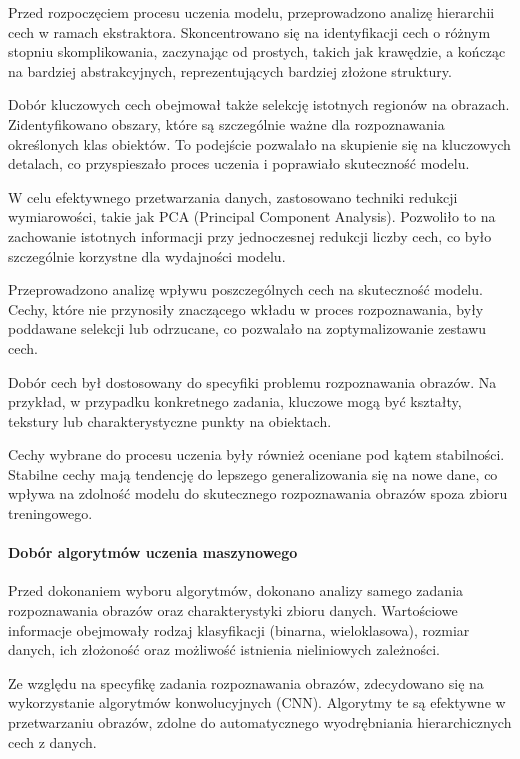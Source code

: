 \documentclass[12pt, a4paper, twoside, openany]{book}
\begin{document}
Przed rozpoczęciem procesu uczenia modelu, przeprowadzono analizę hierarchii cech w ramach ekstraktora.
Skoncentrowano się na identyfikacji cech o różnym stopniu skomplikowania, zaczynając od prostych, takich jak krawędzie, a kończąc na bardziej abstrakcyjnych, reprezentujących bardziej złożone struktury.

Dobór kluczowych cech obejmował także selekcję istotnych regionów na obrazach.
Zidentyfikowano obszary, które są szczególnie ważne dla rozpoznawania określonych klas obiektów.
To podejście pozwalało na skupienie się na kluczowych detalach, co przyspieszało proces uczenia i poprawiało skuteczność modelu.

W celu efektywnego przetwarzania danych, zastosowano techniki redukcji wymiarowości, takie jak PCA (Principal Component Analysis).
Pozwoliło to na zachowanie istotnych informacji przy jednoczesnej redukcji liczby cech, co było szczególnie korzystne dla wydajności modelu.

Przeprowadzono analizę wpływu poszczególnych cech na skuteczność modelu.
Cechy, które nie przynosiły znaczącego wkładu w proces rozpoznawania, były poddawane selekcji lub odrzucane, co pozwalało na zoptymalizowanie zestawu cech.

Dobór cech był dostosowany do specyfiki problemu rozpoznawania obrazów.
Na przykład, w przypadku konkretnego zadania, kluczowe mogą być kształty, tekstury lub charakterystyczne punkty na obiektach.

Cechy wybrane do procesu uczenia były również oceniane pod kątem stabilności. Stabilne cechy mają tendencję do lepszego generalizowania się na nowe dane, co wpływa na zdolność modelu do skutecznego rozpoznawania obrazów spoza zbioru treningowego.

\paragraph{Dobór algorytmów uczenia maszynowego\\}
Przed dokonaniem wyboru algorytmów, dokonano analizy samego zadania rozpoznawania obrazów oraz charakterystyki zbioru danych.
Wartościowe informacje obejmowały rodzaj klasyfikacji (binarna, wieloklasowa), rozmiar danych, ich złożoność oraz możliwość istnienia nieliniowych zależności.

Ze względu na specyfikę zadania rozpoznawania obrazów, zdecydowano się na wykorzystanie algorytmów konwolucyjnych (CNN).
Algorytmy te są efektywne w przetwarzaniu obrazów, zdolne do automatycznego wyodrębniania hierarchicznych cech z danych.
\end{document}
